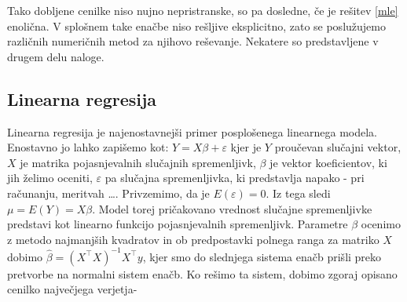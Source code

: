 \documentclass[12pt,a4paper]{amsart}
\theoremstyle{definition} %
\theoremstyle{plain} %
\begin{document}
Tako dobljene cenilke niso nujno nepristranske, so pa dosledne, če je rešitev \eqref{mle} enolična. V splošnem take enačbe niso rešljive eksplicitno, zato se poslužujemo različnih
numeričnih metod za njihovo reševanje. Nekatere so predstavljene v drugem delu naloge.

\subsection{Linearna regresija}
Linearna regresija je najenostavnejši primer posplošenega linearnega modela. Enostavno jo lahko zapišemo kot:
$
    Y = X \beta + \varepsilon
$
kjer je $Y$ proučevan slučajni vektor, $X$ je matrika pojasnjevalnih slučajnih spremenljivk, $\beta$ je vektor koeficientov, ki jih želimo oceniti,
$\varepsilon$ pa slučajna spremenljivka, ki predstavlja napako - pri računanju, meritvah \ldots. Privzemimo, da je $E(\varepsilon) = 0$. Iz tega sledi
$\mu = E(Y) = X\beta$. Model torej pričakovano vrednost slučajne spremenljivke predstavi kot linearno funkcijo pojasnjevalnih spremenljivk.
Parametre $\beta$ ocenimo z metodo najmanjših kvadratov in ob predpostavki polnega ranga za matriko $X$ dobimo $\hat{\beta} =  (X^\top X)^{-1}
X^\top y$, kjer smo do slednjega sistema enačb prišli preko pretvorbe na normalni sistem enačb. Ko rešimo ta sistem, dobimo zgoraj opisano cenilko največjega verjetja-

\end{document}
